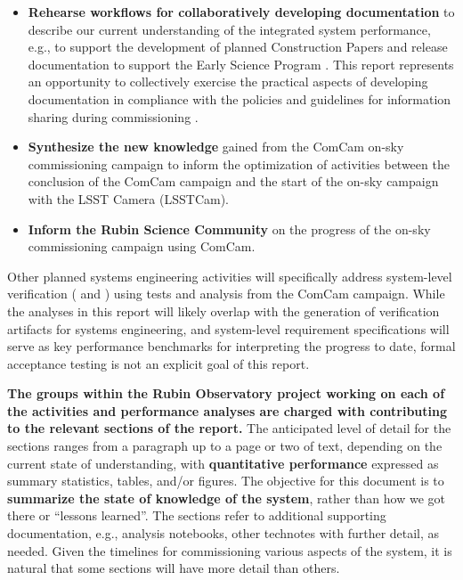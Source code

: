\begin{itemize}

    \item \textbf{Rehearse workflows for collaboratively developing documentation} to describe our current understanding of the integrated system performance, e.g., to support the development of planned Construction Papers and release documentation to support the Early Science Program .
    This report represents an opportunity to collectively exercise the practical aspects of developing documentation in compliance with the policies and guidelines for information sharing during commissioning .

    \item \textbf{Synthesize the new knowledge} gained from the ComCam on-sky commissioning campaign to inform the optimization of activities between the conclusion of the ComCam campaign and the start of the on-sky campaign with the LSST Camera (LSSTCam).

    \item \textbf{Inform the Rubin Science Community} on the progress of the on-sky commissioning campaign using ComCam.

\end{itemize}

Other planned systems engineering activities will specifically address system-level verification ( and ) using tests and analysis from the ComCam campaign.
While the analyses in this report will likely overlap with the generation of verification artifacts for systems engineering, and system-level requirement specifications will serve as key performance benchmarks for interpreting the progress to date, formal acceptance testing is not an explicit goal of this report.

\textbf{The groups within the Rubin Observatory project working on each of the activities and performance analyses are charged with contributing to the relevant sections of the report.}
The anticipated level of detail for the sections ranges from a paragraph up to a page or two of text, depending on the current state of understanding, with \textbf{quantitative performance} expressed as summary statistics, tables, and/or figures.
The objective for this document is to \textbf{summarize the state of knowledge of the system}, rather than how we got there or ``lessons learned''.
The sections refer to additional supporting documentation, e.g., analysis notebooks, other technotes with further detail, as needed.
Given the timelines for commissioning various aspects of the system, it is natural that some sections will have more detail than others.

